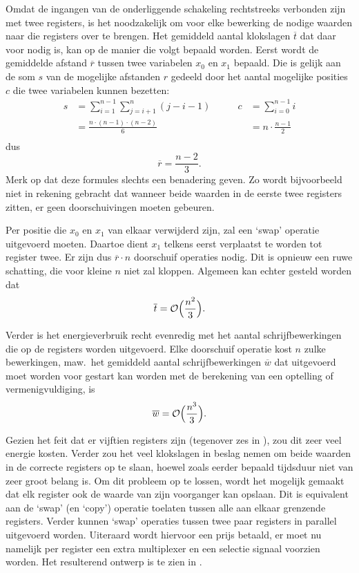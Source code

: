 Omdat de ingangen van de onderliggende schakeling rechtstreeks verbonden zijn met twee registers, is het noodzakelijk om voor elke bewerking de nodige waarden naar die registers over te brengen. Het gemiddeld aantal klokslagen $\overline{t}$ dat daar voor nodig is, kan op de manier die volgt bepaald worden. Eerst wordt de gemiddelde afstand $\overline{r}$ tussen twee variabelen $x_0$ en $x_1$ bepaald. Die is gelijk aan de som $s$ van de mogelijke afstanden $r$ gedeeld door het aantal mogelijke posities $c$ die twee variabelen kunnen bezetten:
\[\begin{aligned}
s	&= \sum_{i = 1}^{n - 1} \sum_{j = i + 1}^n (j - i - 1)
	&\qquad c	&= \sum_{i = 0}^{n - 1} i\\
	&= \frac{n \cdot (n - 1) \cdot (n - 2)}{6}
	&	&= n \cdot \frac{n - 1}{2}\\
\end{aligned}\]
dus
\[\overline{r}	= \frac{n - 2}{3}.\]
Merk op dat deze formules slechts een benadering geven. Zo wordt bijvoorbeeld niet in rekening gebracht dat wanneer beide waarden in de eerste twee registers zitten, er geen doorschuivingen moeten gebeuren.

Per positie die $x_0$ en $x_1$ van elkaar verwijderd zijn, zal een `swap' operatie uitgevoerd moeten. Daartoe dient $x_1$ telkens eerst verplaatst te worden tot register twee. Er zijn dus $\overline{r} \cdot n$ doorschuif operaties nodig. Dit is opnieuw een ruwe schatting, die voor kleine $n$ niet zal kloppen. Algemeen kan echter gesteld worden dat
\[\overline{t} = \mathcal{O} \Bigl( \frac{n^2}{3} \Bigr).\]

Verder is het energieverbruik recht evenredig met het aantal schrijfbewerkingen die op de registers worden uitgevoerd. Elke doorschuif operatie kost $n$ zulke bewerkingen, maw.\ het gemiddeld aantal schrijfbewerkingen $\overline{w}$ dat uitgevoerd moet worden voor gestart kan worden met de berekening van een optelling of vermenigvuldiging, is
\[\overline{w} =  \mathcal{O} \Bigl( \frac{n^3}{3} \Bigr).\]

Gezien het feit dat er vijftien registers zijn (tegenover zes in \cite{lee}), zou dit zeer veel energie kosten. Verder zou het veel klokslagen in beslag nemen om beide waarden in de correcte registers op te slaan, hoewel zoals eerder bepaald tijdsduur niet van zeer groot belang is. Om dit probleem op te lossen, wordt het mogelijk gemaakt dat elk register ook de waarde van zijn voorganger kan opslaan. Dit is equivalent aan de `swap' (en `copy') operatie toelaten tussen alle aan elkaar grenzende registers. Verder kunnen `swap' operaties tussen twee paar registers in parallel uitgevoerd worden. Uiteraard wordt hiervoor een prijs betaald, er moet nu namelijk per register een extra multiplexer en een selectie signaal voorzien worden.  Het resulterend ontwerp is te zien in .

